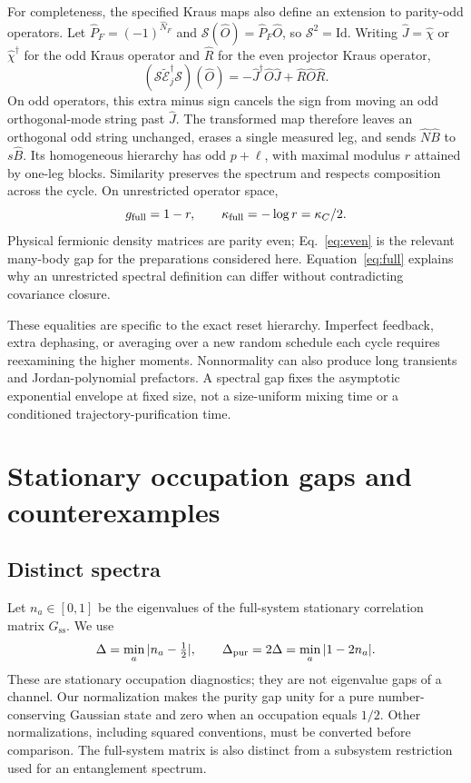 \documentclass[aps,prb,onecolumn,nofootinbib,superscriptaddress,floatfix]{revtex4-2}
\newcommand{\E}{\widetilde{\mathcal E}}
\newcommand{\steady}{\mathrm{ss}}
\begin{document}
For completeness, the specified Kraus maps also define an extension
to parity-odd operators. Let $\hat P_F=(-1)^{\hat N_F}$ and
$\mathcal S(\hat O)=\hat P_F\hat O$, so $\mathcal S^2=\mathrm{Id}$.
Writing $\hat J=\hat\chi$ or $\hat\chi^\dagger$ for the odd Kraus
operator and $\hat R$ for the even projector Kraus operator,
\begin{equation}
 (\mathcal S\E_j^\dagger\mathcal S)(\hat O)
   =-\hat J^\dagger\hat O\hat J+\hat R\hat O\hat R.
 \label{eq:odd_similarity}
\end{equation}
On odd operators, this extra minus sign cancels the sign from moving
an odd orthogonal-mode string past $\hat J$. The transformed map
therefore leaves an orthogonal odd string unchanged, erases a
single measured leg, and sends $\hat N\hat B$ to $s\hat B$.
Its homogeneous hierarchy has odd $p+\ell$, with maximal modulus
$r$ attained by one-leg blocks. Similarity preserves the spectrum
and respects composition across the cycle. On unrestricted
operator space,
\begin{equation}
 g_{\rm full}=1-r,\qquad
 \kappa_{\rm full}=-\log r=\kappa_C/2. \label{eq:full}
\end{equation}
Physical fermionic density matrices are parity even; Eq.~\eqref{eq:even}
is the relevant many-body gap for the preparations considered here.
Equation~\eqref{eq:full} explains why an unrestricted spectral
definition can differ without contradicting covariance closure.

These equalities are specific to the exact reset hierarchy.
Imperfect feedback, extra dephasing, or averaging over a new random
schedule each cycle requires reexamining the higher moments.
Nonnormality can also produce long transients and Jordan-polynomial
prefactors. A spectral gap fixes the asymptotic exponential envelope
at fixed size, not a size-uniform mixing time or a conditioned
trajectory-purification time.

\section{Stationary occupation gaps and counterexamples}
\label{sec:stationary}
\subsection{Distinct spectra}
Let $n_a\in[0,1]$ be the eigenvalues of the full-system stationary
correlation matrix $G_\steady$. We use
\begin{equation}
 \Delta=\min_a|n_a-\tfrac12|,\qquad
 \Delta_{\rm pur}=2\Delta=\min_a|1-2n_a|.
 \label{eq:purity}
\end{equation}
These are stationary occupation diagnostics; they are not eigenvalue
gaps of a channel. Our normalization makes the purity gap unity for
a pure number-conserving Gaussian state and zero when an occupation
equals $1/2$. Other normalizations, including squared conventions,
must be converted before comparison. The full-system matrix is also
distinct from a subsystem restriction used for an entanglement spectrum.
\end{document}
